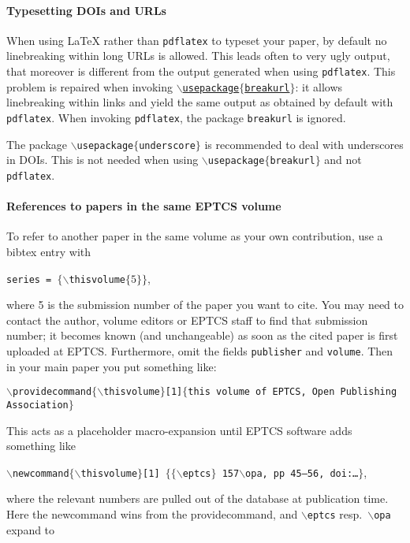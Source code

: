 \documentclass[submission,copyright,creativecommons]{eptcs}
\begin{document}
\paragraph{Typesetting DOIs and URLs}

When using {\LaTeX} rather than {\tt pdflatex} to typeset your paper, by
default no linebreaking within long URLs is allowed. This leads often
to very ugly output, that moreover is different from the output
generated when using {\tt pdflatex}. This problem is repaired when
invoking \href{http://eptcs.web.cse.unsw.edu.au/breakurl.sty}
{\tt $\backslash$usepackage$\{$breakurl$\}$}: it allows linebreaking
within links and yield the same output as obtained by default with
{\tt pdflatex}. 
When invoking {\tt pdflatex}, the package {\tt breakurl} is ignored.

The package {\tt $\backslash$usepackage$\{$underscore$\}$} is
recommended to deal with underscores in DOIs. This is not needed when
using {\tt $\backslash$usepackage$\{$breakurl$\}$} and not {\tt pdflatex}.

\paragraph{References to papers in the same EPTCS volume}

To refer to another paper in the same volume as your own contribution,
use a bibtex entry with
\begin{center}
  {\tt series    = $\{\backslash$thisvolume$\{5\}\}$},
\end{center}
where 5 is the submission number of the paper you want to cite.
You may need to contact the author, volume editors or EPTCS staff to
find that submission number; it becomes known (and unchangeable)
as soon as the cited paper is first uploaded at EPTCS\@.
Furthermore, omit the fields {\tt publisher} and {\tt volume}.
Then in your main paper you put something like:

\noindent
{\small \tt $\backslash$providecommand$\{\backslash$thisvolume$\}$[1]$\{$this
  volume of EPTCS, Open Publishing Association$\}$}

\noindent
This acts as a placeholder macro-expansion until EPTCS software adds
something like

\noindent
{\small \tt $\backslash$newcommand$\{\backslash$thisvolume$\}$[1]%
  $\{\{\backslash$eptcs$\}$ 157$\backslash$opa, pp 45--56, doi:\dots$\}$},

\noindent
where the relevant numbers are pulled out of the database at publication time.
Here the newcommand wins from the providecommand, and {\tt \small $\backslash$eptcs}
resp.\ {\tt \small $\backslash$opa} expand to
\end{document}
